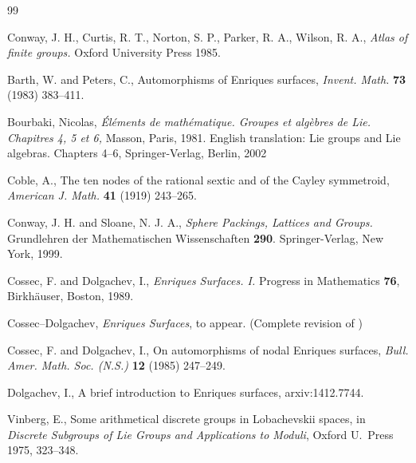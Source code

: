\documentclass[12pt]{amsart}
\numberwithin{theorem}{section}
\numberwithin{equation}{section}
\numberwithin{figure}{section}
\theoremstyle{remark}
\begin{document}
\begin{thebibliography}{99}

 Conway, J. H., Curtis, R. T., Norton, S. P., Parker,
  R. A., Wilson, R. A., {\it Atlas of finite groups.} Oxford
  University Press 1985.

  Barth, W. and Peters, C., Automorphisms of Enriques surfaces, {\it
    Invent. Math.} {\bf 73} (1983) 383--411.

Bourbaki, Nicolas, {\it \'El\'ements de
  math\'ematique. Groupes et alg\`ebres de Lie. Chapitres 4, 5 et 6,}
  Masson, Paris, 1981. English translation: Lie groups and Lie
  algebras. Chapters 4–6, Springer-Verlag, Berlin, 2002
  
  Coble, A., The ten nodes of the rational sextic and of the Cayley
  symmetroid, {\it American J. Math.} {\bf 41} (1919) 243--265.
  
  Conway, J. H. and Sloane, N. J. A., {\it Sphere Packings, Lattices and
  Groups.} Grundlehren der
  Mathematischen Wissenschaften {\bf 290}. Springer-Verlag, New York,
  1999.

  Cossec, F. and Dolgachev, I.,
{\it Enriques Surfaces. I.}
Progress in Mathematics {\bf 76}, Birkh\"auser, Boston, 1989.

 Cossec--Dolgachev, {\it Enriques Surfaces}, to
  appear. (Complete revision of \cite{CD-old})

Cossec, F. and Dolgachev, I., On automorphisms of nodal Enriques surfaces,
{\it Bull. Amer. Math. Soc. (N.S.)} {\bf 12} (1985) 247--249.

 Dolgachev, I., A
  brief introduction to Enriques surfaces, arxiv:1412.7744.
    
 Vinberg, E., Some arithmetical discrete groups
  in Lobachevskii spaces, in {\it Discrete Subgroups of Lie Groups and
    Applications to Moduli}, Oxford U.\ Press 1975, 323--348.

\end{thebibliography}
\end{document}
